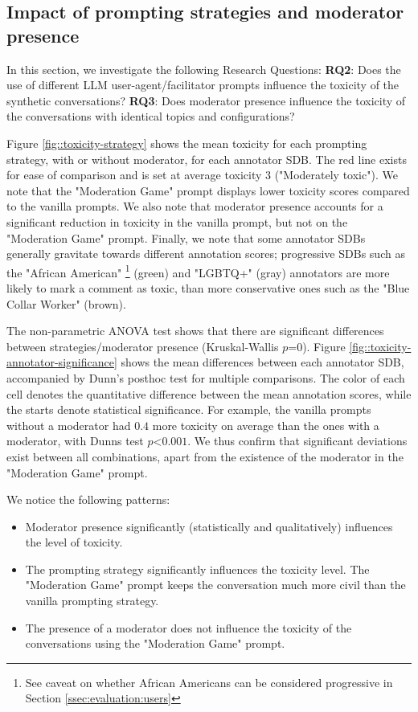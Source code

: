 \subsection{Impact of prompting strategies and moderator presence}
\label{ssec:evaluation:prompts}

In this section, we investigate the following Research Questions: \textbf{RQ2}: Does the use of different LLM user-agent/facilitator prompts influence the toxicity of the synthetic conversations? \textbf{RQ3}: Does moderator presence influence the toxicity of the conversations with identical topics and configurations?

Figure \ref{fig::toxicity-strategy} shows the mean toxicity for each prompting strategy, with or without moderator, for each annotator \ac{SDB}. The red line exists for ease of comparison and is set at average toxicity 3 ("Moderately toxic"). We note that the "Moderation Game" prompt displays lower toxicity scores compared to the vanilla prompts. We also note that moderator presence accounts for a significant reduction in toxicity in the vanilla prompt, but not on the "Moderation Game" prompt. Finally, we note that some annotator \acp{SDB} generally gravitate towards different annotation scores; progressive \acp{SDB} such as the "African American" \footnote{See caveat on whether African Americans can be considered progressive in Section \ref{ssec:evaluation:users}} (green) and "LGBTQ+" (gray) annotators are more likely to mark a comment as toxic, than more conservative ones such as the "Blue Collar Worker" (brown).

The non-parametric ANOVA test shows that there are significant differences between strategies/moderator presence (Kruskal-Wallis $p\text{=}0$). Figure \ref{fig::toxicity-annotator-significance} shows the mean differences between each annotator \ac{SDB}, accompanied by Dunn's posthoc test for multiple comparisons. The color of each cell denotes the quantitative difference between the mean annotation scores, while the starts denote statistical significance. For example, the vanilla prompts without a moderator had $0.4$ more toxicity on average than the ones with a moderator, with Dunns test $p\text{<}0.001$. We thus confirm that significant deviations exist between all combinations, apart from the existence of the moderator in the "Moderation Game" prompt.

We notice the following patterns:

\begin{itemize}
	\item Moderator presence significantly (statistically and qualitatively) influences the level of toxicity.
	
	\item The prompting strategy significantly influences the toxicity level. The "Moderation Game" prompt keeps the conversation much more civil than the vanilla prompting strategy.
	
	\item The presence of a moderator does not influence the toxicity of the conversations using the "Moderation Game" prompt.
\end{itemize}

